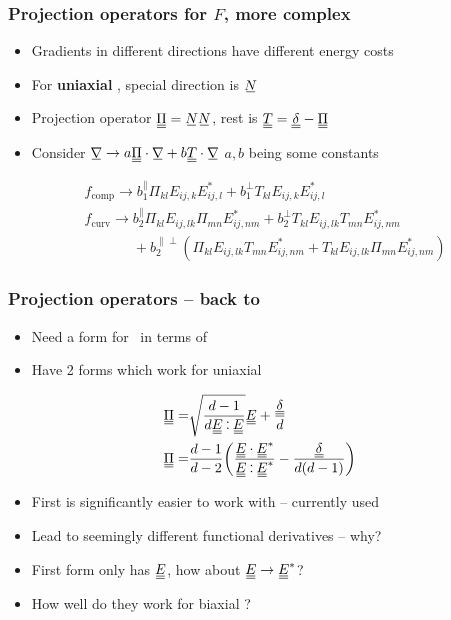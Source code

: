 \documentclass[10pt,mathserif]{beamer}
\begin{document}
\begin{frame}
    \frametitle{Projection operators for $F$, more complex}
    \begin{itemize}
        \item Gradients in different directions have different energy costs
        \item For \textbf{uniaxial} \EE, special direction is $\su{N}$
        \item Projection operator $\du{\Pi}=\su{N}\su{N}$, rest is $\du{T} = \du{\delta} - \du{\Pi}$
        \item Consider $\su{\nabla} \rightarrow a \du{\Pi}\cdot\su{\nabla} + b \du{T}\cdot\su{\nabla}$ \color{gray} $a, b$ being some constants \normalcolor
    \end{itemize}

    \begin{align*}
        &f_\text{comp} \rightarrow b_1^\parallel \Pi_{kl} E_{ij,k}E_{ij,l}^* + b_1^\perp T_{kl} E_{ij,k}E_{ij,l}^* \\
        &f_\text{curv} \rightarrow b_2^\parallel \Pi_{kl}E_{ij,lk}\Pi_{mn}E_{ij,nm}^* + b_2^\perp T_{kl}E_{ij,lk}T_{mn}E_{ij,nm}^* \\
        &\phantom{f_\text{curv} \rightarrow}+ b_2^{\parallel\perp}(\Pi_{kl}E_{ij,lk}T_{mn}E_{ij,nm}^* + T_{kl}E_{ij,lk}\Pi_{mn}E_{ij,nm}^*)
    \end{align*}
\end{frame}

\begin{frame}
    \frametitle{Projection operators -- back to \EE}
    \begin{itemize}
        \item Need a form for \PP\ in terms of \EE
        \item Have 2 forms which work for uniaxial \EE
    \end{itemize}
    \begin{align*}
        \du{\Pi} =& \sqrt{\frac{d-1}{d \du{E} \cddot \du{E}}} \du{E} + \frac{\du{\delta}}{d} \\
        \du{\Pi} =& \frac{d-1}{d-2}\qty(\frac{\du{E} \cdot \du{E}^*}{\du{E} \cddot \du{E}^*} - \frac{\du{\delta}}{d(d-1)})
    \end{align*}
    \begin{itemize}
        \item First is significantly easier to work with -- currently used
        \color{gray}
        \item Lead to seemingly different functional derivatives -- why?
        \item First form only has $\du{E}$, how about $\du{E} \rightarrow \du{E}^*$?
        \item How well do they work for biaxial \EE?
        \normalcolor
    \end{itemize}
\end{frame}
\end{document}
